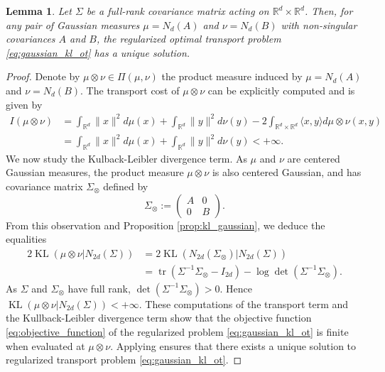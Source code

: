 \documentclass[]{article}
\DeclareMathOperator{\KL}{KL}
\DeclareMathOperator{\tr}{tr}
\numberwithin{equation}{section}
\theoremstyle{plain}
\newtheorem{lem}{Lemma}[section]
\begin{document}
\begin{lem} Let $\Sigma$ be a full-rank covariance matrix acting on $\mathbb{R}^d \times \mathbb{R}^d$. Then, for any pair of Gaussian measures $\mu = N_d(A)$ and $\nu = N_d(B)$ with non-singular covariances $A$ and $B$, the regularized optimal transport problem \eqref{eq:gaussian_kl_ot} has a unique solution.
\end{lem}
\begin{proof}	
	Denote by $\mu \otimes \nu \in \Pi(\mu, \nu)$ the product measure induced by $\mu = N_d(A)$ and $\nu = N_d(B)$. 
	The transport cost of $\mu \otimes \nu$ can be explicitly computed and is given by 
	\begin{align*}
		I(\mu \otimes \nu ) & = \int_{\mathbb{R}^d}\|x \|^2 d\mu(x) + \int_{\mathbb{R}^d} \|y \|^2 d\nu(y) - 2 \int_{\mathbb{R}^d \times \mathbb{R}^d} \langle x , y \rangle d\mu\otimes \nu(x,y) \\
		& = \int_{\mathbb{R}^d}\|x \|^2 d\mu(x) + \int_{\mathbb{R}^d} \|y \|^2 d\nu(y) < + \infty.
	\end{align*}
We now study the Kulback-Leibler divergence term. As $\mu$ and $\nu$ are centered Gaussian measures, the product measure $\mu \otimes \nu$ is also centered Gaussian, and has covariance matrix $\Sigma_{\otimes}$ defined by
\begin{equation*}
	\Sigma_{\otimes} := \begin{pmatrix}
		A & 0 \\
		0 & B
	\end{pmatrix}.
\end{equation*}
From this observation and Proposition \ref{prop:kl_gaussian}, we deduce the equalities 
\begin{align*}
	2\KL(\mu\otimes \nu | N_{2d}(\Sigma)) & = 2\KL(N_{2d}(\Sigma_{\otimes})| N_{2d}(\Sigma)) \\
	& = \tr(\Sigma^{-1} \Sigma_{\otimes} - I_{2d}) - \log \det(\Sigma^{-1}\Sigma_{\otimes}).
\end{align*}
As $\Sigma $ and $\Sigma_{\otimes}$ have full rank, $\det(\Sigma^{-1}\Sigma_{\otimes}) > 0$. Hence $\KL(\mu\otimes \nu | N_{2d}(\Sigma)) < +\infty$. These computations of the transport term and the Kullback-Leibler divergence term show that the objective function \eqref{eq:objective_function} of the regularized problem \eqref{eq:gaussian_kl_ot} is finite when evaluated at $\mu \otimes \nu$. Applying \cite[Thm.~2.1]{nutz2021introduction} ensures that there exists a unique solution to regularized transport problem \eqref{eq:gaussian_kl_ot}.
\end{proof}
\end{document}
